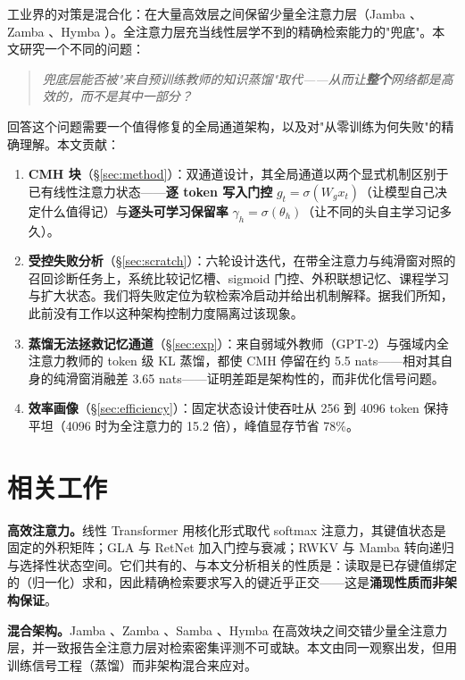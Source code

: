 \documentclass[11pt]{ctexart}
\newcommand{\cmh}{CMH}
\begin{document}
工业界的对策是混合化：在大量高效层之间保留少量全注意力层（Jamba \cite{waleffe2024jamba}、Zamba \cite{glorioso2024zamba}、Hymba \cite{wang2024hymba}）。全注意力层充当线性层学不到的精确检索能力的"兜底"。本文研究一个不同的问题：

\begin{quote}\itshape
兜底层能否被"来自预训练教师的知识蒸馏"取代——从而让\textbf{整个}网络都是高效的，而不是其中一部分？
\end{quote}

回答这个问题需要一个值得修复的全局通道架构，以及对"从零训练为何失败"的精确理解。本文贡献：

\begin{enumerate}
\item \textbf{\cmh{} 块}（\S\ref{sec:method}）：双通道设计，其全局通道以两个显式机制区别于已有线性注意力状态——\textbf{逐 token 写入门控} $g_t=\sigma(W_g x_t)$（让模型自己决定什么值得记）与\textbf{逐头可学习保留率} $\gamma_h=\sigma(\theta_h)$（让不同的头自主学习记多久）。
\item \textbf{受控失败分析}（\S\ref{sec:scratch}）：六轮设计迭代，在带全注意力与纯滑窗对照的召回诊断任务上，系统比较记忆槽、sigmoid 门控、外积联想记忆、课程学习与扩大状态。我们将失败定位为软检索冷启动并给出机制解释。据我们所知，此前没有工作以这种架构控制力度隔离过该现象。
\item \textbf{蒸馏无法拯救记忆通道}（\S\ref{sec:exp}）：来自弱域外教师（GPT-2）与强域内全注意力教师的 token 级 KL 蒸馏，都使 \cmh{} 停留在约 5.5 nats——相对其自身的纯滑窗消融差 3.65 nats——证明差距是架构性的，而非优化信号问题。
\item \textbf{效率画像}（\S\ref{sec:efficiency}）：固定状态设计使吞吐从 256 到 4096 token 保持平坦（4096 时为全注意力的 15.2 倍），峰值显存节省 78\%。
\end{enumerate}

\section{相关工作}\label{sec:related}

\textbf{高效注意力。}线性 Transformer \cite{katharopoulos2020} 用核化形式取代 softmax 注意力，其键值状态是固定的外积矩阵；GLA \cite{yang2023gla} 与 RetNet \cite{sun2023retnet} 加入门控与衰减；RWKV \cite{peng2023rwkv} 与 Mamba \cite{gu2023mamba} 转向递归与选择性状态空间。它们共有的、与本文分析相关的性质是：读取是已存键值绑定的（归一化）求和，因此精确检索要求写入的键近乎正交——这是\textbf{涌现性质而非架构保证}。

\textbf{混合架构。}Jamba \cite{waleffe2024jamba}、Zamba \cite{glorioso2024zamba}、Samba \cite{wang2024samba}、Hymba \cite{wang2024hymba} 在高效块之间交错少量全注意力层，并一致报告全注意力层对检索密集评测不可或缺。本文由同一观察出发，但用训练信号工程（蒸馏）而非架构混合来应对。
\end{document}
